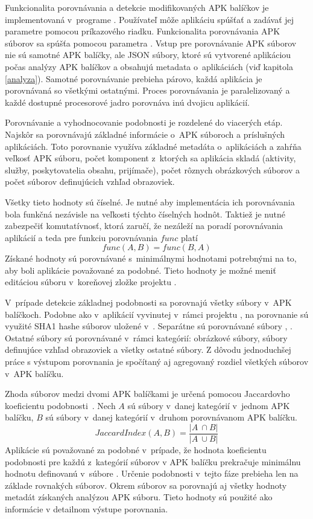 Funkcionalita porovnávania a detekcie modifikovaných APK balíčkov je implementovaná v~programe . Používateľ môže aplikáciu spúšťať a zadávať jej parametre pomocou príkazového riadku. Funkcionalita porovnávania APK súborov sa spúšťa pomocou parametra . Vstup pre porovnávanie APK súborov nie sú samotné APK balíčky, ale JSON súbory, ktoré sú vytvorené aplikáciou  počas analýzy APK balíčkov a obsahujú metadata o~aplikáciách (viď kapitola \ref{analyza}). Samotné porovnávanie prebieha párovo, každá aplikácia je porovnávaná so všetkými ostatnými. Proces porovnávania je paralelizovaný a každé dostupné procesorové jadro porovnáva inú dvojicu aplikácií. 

Porovnávanie a vyhodnocovanie podobnosti je rozdelené do viacerých etáp. Najskôr sa porovnávajú základné informácie o~APK súboroch a príslušných aplikáciách. Toto porovnanie využíva základné metadáta o~aplikáciách a zahŕňa veľkosť APK súboru, počet komponent z~ktorých sa aplikácia skladá (aktivity, služby, poskytovatelia obsahu, prijímače), počet rôznych obrázkových súborov a počet súborov definujúcich vzhľad obrazoviek.

Všetky tieto hodnoty sú číselné. Je nutné aby implementácia ich porovnávania bola funkčná nezávisle na veľkosti týchto číselných hodnôt. Taktiež je nutné zabezpečiť komutatívnosť, ktorá zaručí, že nezáleží na poradí porovnávania aplikácií a teda pre funkciu porovnávania $func$ platí \[func(A,B) = func(B,A)\] Získané hodnoty sú porovnávané s~minimálnymi hodnotami potrebnými na to, aby boli aplikácie považované za podobné. Tieto hodnoty je možné meniť editáciou súboru  v~koreňovej zložke projektu .

V~prípade detekcie základnej podobnosti sa porovnajú všetky súbory v~APK balíčkoch. Podobne ako v~aplikácií vyvinutej v~rámci projektu , na porovnanie sú využité SHA1 hashe súborov uložené v~. Separátne sú porovnávané súbory , . Ostatné súbory sú porovnávané v~rámci kategórií: obrázkové súbory, súbory definujúce vzhľad obrazoviek a všetky ostatné súbory. Z dôvodu jednoduchšej práce s výstupom porovnania je spočítaný aj agregovaný rozdiel všetkých súborov v~APK balíčku. 

Zhoda súborov medzi dvomi APK balíčkami je určená pomocou Jaccardovho koeficientu podobnosti~\cite{Phillips2013}. Nech $A$ sú súbory v~danej kategórií v~jednom APK balíčku, $B$ sú súbory v~danej kategórií v~druhom porovnávanom APK balíčku. \[Jaccard Index(A,B) = \frac{|A~\cap B|}{ |A~\cup B|}\] Aplikácie sú považované za podobné v~prípade, že hodnota koeficientu podobnosti pre každú z~kategórií súborov v APK balíčku prekračuje minimálnu hodnotu definovanú v~súbore . Určenie podobnosti v~tejto fáze prebieha len na základe rovnakých súborov. Okrem súborov sa porovnajú aj všetky hodnoty metadát získaných analýzou APK súboru. Tieto hodnoty sú použité ako informácie v detailnom výstupe porovnania.

